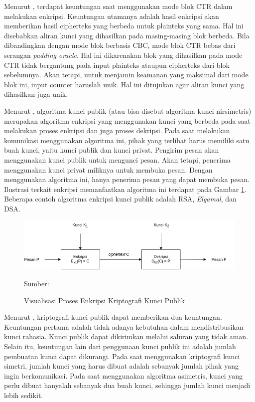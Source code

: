 Menurut \textcite{munir2019}, terdapat keuntungan saat menggunakan mode blok CTR dalam melakukan enkripsi. Keuntungan utamanya adalah hasil enkripsi akan memberikan hasil cipherteks yang berbeda untuk plainteks yang sama. Hal ini disebabkan aliran kunci yang dihasilkan pada masing-masing blok berbeda. Bila dibandingkan dengan mode blok berbasis CBC, mode blok CTR bebas dari serangan \emph{padding oracle}. Hal ini dikarenakan blok yang dihasilkan pada mode CTR tidak bergantung pada input plainteks ataupun cipherteks dari blok sebelumnya. Akan tetapi, untuk menjamin keamanan yang maksimal dari mode blok ini, input counter haruslah unik. Hal ini ditujukan agar aliran kunci yang dihasilkan juga unik.

Menurut \textcite{munir2019}, algoritma kunci publik (atau bisa disebut algoritma kunci nirsimetris) merupakan algoritma enkripsi yang menggunakan kunci yang berbeda pada saat melakukan proses enkripsi dan juga proses dekripsi. Pada saat melakukan komunikasi menggunakan algoritma ini, pihak yang terlibat harus memiliki satu buah kunci, yaitu kunci publik dan kunci privat. Pengirim pesan akan menggunakan kunci publik untuk mengunci pesan. Akan tetapi, penerima menggunakan kunci privat miliknya untuk membuka pesan. Dengan menggunakan algoritma ini, hanya penerima pesan yang dapat membuka pesan. Ilustrasi terkait enkripsi memanfaatkan algoritma ini terdapat pada Gambar \ref{fig:crypto.asymetric}. Beberapa contoh algoritma enkripsi kunci publik adalah RSA, \emph{Elgamal}, dan DSA.

\begin{figure}[!h]
  \centering
  \includegraphics[width=\textwidth]{chapters/res/chapter-2/img/crypto.asymetric.png}
  \caption{Visualisasi Proses Enkripsi Kriptografi Kunci Publik} 
  \label{fig:crypto.asymetric}
  Sumber: \textcite{munir2019}
\end{figure}

Menurut \textcite{munir2019}, kriptografi kunci publik dapat memberikan dua keuntungan. Keuntungan pertama adalah tidak adanya kebutuhan dalam mendistribusikan kunci rahasia. Kunci publik dapat dikirimkan melalui saluran yang tidak aman. Selain itu, keuntungan lain dari penggunaan kunci publik ini adalah jumlah pembuatan kunci dapat dikurangi. Pada saat menggunakan kriptografi kunci simetri, jumlah kunci yang harus dibuat adalah sebanyak jumlah pihak yang ingin berkomunikasi. Pada saat menggunakan algoritma asimetris, kunci yang perlu dibuat hanyalah sebanyak dua buah kunci, sehingga jumlah kunci menjadi lebih sedikit.

